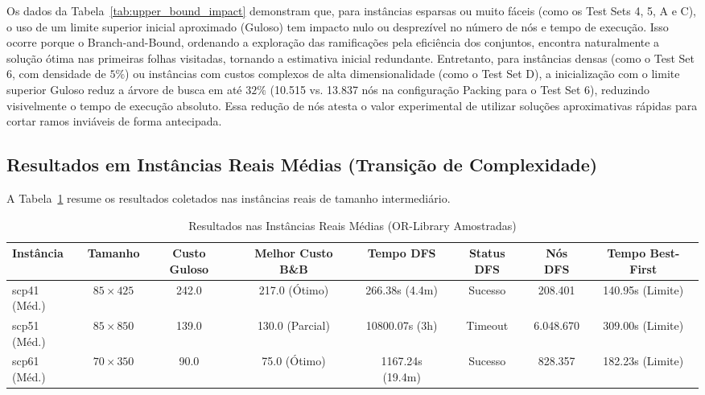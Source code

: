 \documentclass[conference]{IEEEtran}
\begin{document}
Os dados da Tabela~\ref{tab:upper_bound_impact} demonstram que, para instâncias esparsas ou muito fáceis (como os Test Sets 4, 5, A e C), o uso de um limite superior inicial aproximado (Guloso) tem impacto nulo ou desprezível no número de nós e tempo de execução. Isso ocorre porque o Branch-and-Bound, ordenando a exploração das ramificações pela eficiência dos conjuntos, encontra naturalmente a solução ótima nas primeiras folhas visitadas, tornando a estimativa inicial redundante.
Entretanto, para instâncias densas (como o Test Set 6, com densidade de $5\%$) ou instâncias com custos complexos de alta dimensionalidade (como o Test Set D), a inicialização com o limite superior Guloso reduz a árvore de busca em até $32\%$ (10.515 vs. 13.837 nós na configuração Packing para o Test Set 6), reduzindo visivelmente o tempo de execução absoluto. Essa redução de nós atesta o valor experimental de utilizar soluções aproximativas rápidas para cortar ramos inviáveis de forma antecipada.

\subsection{Resultados em Instâncias Reais Médias (Transição de Complexidade)}
A Tabela~\ref{tab:real_medium} resume os resultados coletados nas instâncias reais de tamanho intermediário.

\begin{table}[htbp]
\caption{Resultados nas Instâncias Reais Médias (OR-Library Amostradas)}
\label{tab:real_medium}
\begin{center}
\begin{tabular}{lccccccc}
\toprule
\textbf{Instância} & \textbf{Tamanho} & \textbf{Custo Guloso} & \textbf{Melhor Custo B\&B} & \textbf{Tempo DFS} & \textbf{Status DFS} & \textbf{Nós DFS} & \textbf{Tempo Best-First} \\
\midrule
scp41 (Méd.) & $85 \times 425$ & 242.0 & 217.0 (Ótimo) & 266.38s (4.4m) & Sucesso & 208.401 & 140.95s (Limite) \\
scp51 (Méd.) & $85 \times 850$ & 139.0 & 130.0 (Parcial) & 10800.07s (3h) & Timeout & 6.048.670 & 309.00s (Limite) \\
scp61 (Méd.) & $70 \times 350$ & 90.0 & 75.0 (Ótimo) & 1167.24s (19.4m) & Sucesso & 828.357 & 182.23s (Limite) \\
\bottomrule
\end{tabular}
\end{center}
\end{table}
\end{document}
